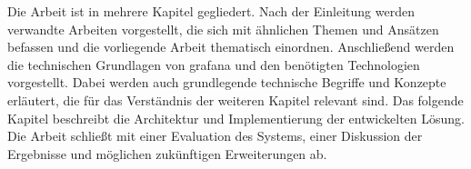 Die Arbeit ist in mehrere Kapitel gegliedert. Nach der Einleitung werden verwandte
Arbeiten vorgestellt, die sich mit ähnlichen Themen und Ansätzen befassen und die
vorliegende Arbeit thematisch einordnen. Anschließend werden die technischen
Grundlagen von \gls{grafana} und den benötigten Technologien vorgestellt. Dabei werden
auch grundlegende technische Begriffe und Konzepte erläutert, die für das Verständnis
der weiteren Kapitel relevant sind. Das folgende Kapitel beschreibt die Architektur und
Implementierung der entwickelten Lösung. Die Arbeit schließt mit einer Evaluation des
Systems, einer Diskussion der Ergebnisse und möglichen zukünftigen Erweiterungen ab.